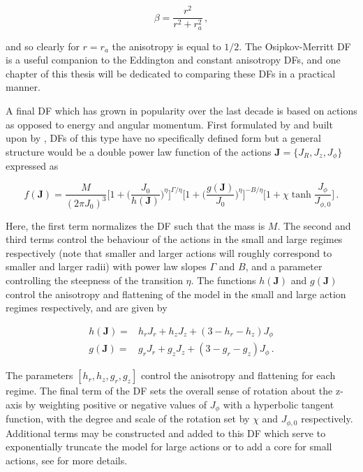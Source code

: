 \begin{equation}
    \label{ch1:eq:osipkov-merritt-anisotropy}
    \beta = \frac{r^{2}}{r^{2} + r_{a}^{2}}\,,
\end{equation}

and so clearly for $r=r_{a}$ the anisotropy is equal to $1/2$. The Osipkov-Merritt DF is a useful companion to the Eddington and constant anisotropy DFs, and one chapter of this thesis will be dedicated to comparing these DFs in a practical manner.

A final DF which has grown in popularity over the last decade is based on actions as opposed to energy and angular momentum. First formulated by \textcite{binney14d} and built upon by \textcite{posti15}, DFs of this type have no specifically defined form but a general structure would be a double power law function of the actions $\mathbf{J} = \{ J_{R}, J_{z}, J_{\phi} \}$ expressed as

\begin{equation}
    \label{ch1:eq:action-df}
    f(\mathbf{J}) = \frac{M}{(2\pi J_{0})^{3}} 
    \bigg[ 1 + \bigg( \frac{J_{0}}{h(\mathbf{J})} \bigg)^{\eta} \bigg]^{\Gamma/\eta} 
    \bigg[ 1 + \bigg( \frac{g(\mathbf{J})}{J_{0}} \bigg)^{\eta} \bigg]^{-B/\eta}
    \bigg[ 1 + \chi \tanh \frac{J_{\phi}}{J_{\phi,0}} \bigg]
    \,.
\end{equation}

\noindent Here, the first term normalizes the DF such that the mass is $M$. The second and third terms control the behaviour of the actions in the small and large regimes respectively (note that smaller and larger actions will roughly correspond to smaller and larger radii) with power law slopes $\Gamma$ and $B$, and a parameter controlling the steepness of the transition $\eta$. The functions $h(\mathbf{J})$ and $g(\mathbf{J})$ control the anisotropy and flattening of the model in the small and large action regimes respectively, and are given by 

\begin{equation}
\label{ch1:eq:action-df-flattening-anisotropy}
\begin{split}
    h(\mathbf{J}) = & h_{r} J_{r} + h_{z} J_{z} + (3-h_{r}-h_{z}) J_{\phi} \\
    g(\mathbf{J}) = & g_{r} J_{r} + g_{z} J_{z} + (3-g_{r}-g_{z}) J_{\phi}\,.
\end{split}
\end{equation}

\noindent The parameters $[h_{r}, h_{z}, g_{r}, g_{z}]$ control the anisotropy and flattening for each regime. The final term of the DF sets the overall sense of rotation about the z-axis by weighting positive or negative values of $J_{\phi}$ with a hyperbolic tangent function, with the degree and scale of the rotation set by $\chi$ and $J_{\phi,0}$ respectively. Additional terms may be constructed and added to this DF which serve to exponentially truncate the model for large actions or to add a core for small actions, see \textcite{binney14d} for more details.

